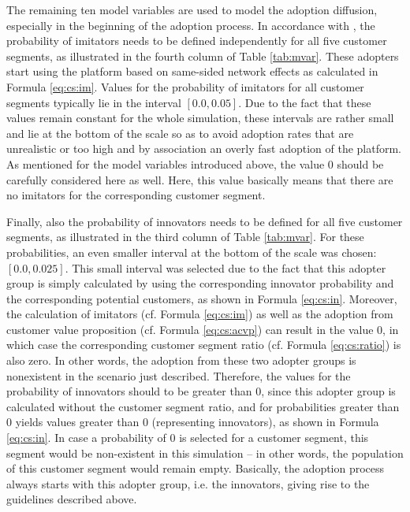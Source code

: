The remaining ten model variables are used to model the adoption diffusion, especially in the beginning of the adoption process. In accordance with \citet[p. 19]{Sterman2001}, the probability of imitators needs to be defined independently for all five customer segments, as illustrated in the fourth column of Table \ref{tab:mvar}. These adopters start using the platform based on same-sided network effects as calculated in Formula \ref{eq:cs:im}. Values for the probability of imitators for all customer segments typically lie in the interval $[0.0, 0.05]$. Due to the fact that these values remain constant for the whole simulation, these intervals are rather small and lie at the bottom of the scale so as to avoid adoption rates that are unrealistic or too high and by association an overly fast adoption of the platform. As mentioned for the model variables introduced above, the value $0$ should be carefully considered here as well. Here, this value basically means that there are no imitators for the corresponding customer segment.

Finally, also the probability of innovators needs to be defined for all five customer segments, as illustrated in the third column of Table \ref{tab:mvar}. For these probabilities, an even smaller interval at the bottom of the scale was chosen: $[0.0,0.025]$. This small interval was selected due to the fact that this adopter group is simply calculated by using the corresponding innovator probability and the corresponding potential customers, as shown in Formula \ref{eq:cs:in}. Moreover, the calculation of imitators (cf. Formula \ref{eq:cs:im}) as well as the adoption from customer value proposition (cf. Formula \ref{eq:cs:acvp}) can result in the value $0$, in which case the corresponding customer segment ratio (cf. Formula \ref{eq:cs:ratio}) is also zero. In other words, the adoption from these two adopter groups is nonexistent in the scenario just described. Therefore, the values for the probability of innovators should to be greater than $0$, since this adopter group is calculated without the customer segment ratio, and for probabilities greater than $0$ yields values greater than $0$ (representing innovators), as shown in Formula \ref{eq:cs:in}. In case a probability of $0$ is selected for a customer segment, this segment would be non-existent in this simulation -- in other words, the population of this customer segment would remain empty. Basically, the adoption process always starts with this adopter group, i.e. the innovators, giving rise to the guidelines described above.


